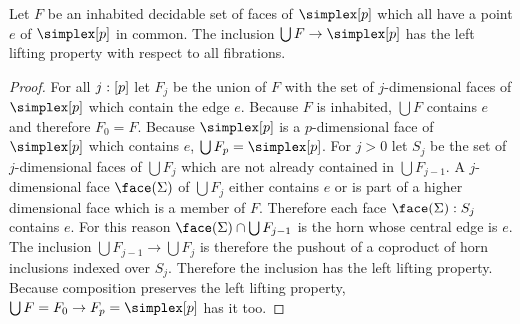 \documentclass[csh.tex]{subfiles}
\begin{document}
\begin{lemma} Let $F$ be an inhabited decidable set of faces of $\simplex[p]$ which all have a point $e$ of $\simplex[p]$ in common. The inclusion $\bigcup F\to \simplex[p]$ has the left lifting property with respect to all fibrations. \label{face completion} \end{lemma}

\begin{proof} For all $j:[p]$ let $F_j$ be the union of $F$ with the set of $j$-dimensional faces of $\simplex[p]$ which contain the edge $e$. Because $F$ is inhabited, $\bigcup F$ contains $e$ and therefore $F_0=F$. Because $\simplex[p]$ is a $p$-dimensional face of $\simplex[p]$ which contains $e$, $\bigcup F_p = \simplex[p]$. For $j>0$ let $S_j$ be the set of $j$-dimensional faces of $\bigcup F_j$ which are not already contained in $\bigcup F_{j-1}$. A $j$-dimensional face $\face(\Sigma)$ of $\bigcup F_j$ either contains $e$ or is part of a higher dimensional face which is a member of $F$. Therefore each face $\face(\Sigma)\of S_j$ contains $e$. For this reason $\face(\Sigma)\cap \bigcup F_{j-1}$ is the horn whose central edge is $e$. The inclusion $\bigcup F_{j-1}\to\bigcup F_j$ is therefore the pushout of a coproduct of horn inclusions indexed over $S_j$. Therefore the inclusion has the left lifting property. Because composition preserves the left lifting property, $\bigcup F = F_0\to F_p = \simplex[p]$ has it too. 
\end{proof}
\end{document}
